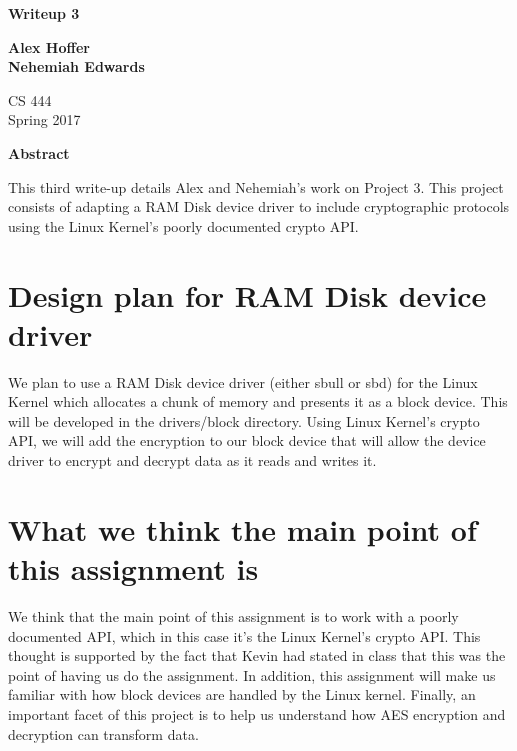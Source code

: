 \documentclass[letterpaper,10pt,titlepage]{article}
\begin{document}
\begin{titlepage}
    \begin{center}
        \vspace*{3.5cm}

        \textbf{Writeup 3}

        \vspace{0.5cm}

        \textbf{Alex Hoffer\\}
	\textbf{Nehemiah Edwards}

        \vspace{0.8cm}

        CS 444\\
        Spring 2017\\

        \vspace{1cm}

        \textbf{Abstract}\\

        \vspace{0.5cm}

	This third write-up details Alex and Nehemiah's work on Project 3. This project consists of adapting a RAM Disk device driver to include cryptographic protocols using the Linux Kernel's poorly documented crypto API.

        \vfill

    \end{center}
\end{titlepage}

\newpage

\tableofcontents

\newpage

\section{Design plan for RAM Disk device driver}
We plan to use a RAM Disk device driver (either sbull or sbd) for the Linux Kernel which allocates a chunk of memory and presents it as a block device. This will be developed in the drivers/block directory. Using Linux Kernel's crypto API, we will add the encryption to our block device that will allow the device driver to encrypt and decrypt data as it reads and writes it.

\section{What we think the main point of this assignment is}
We think that the main point of this assignment is to work with a poorly documented API, which in this case it's the Linux Kernel's crypto API. This thought is supported by the fact that Kevin had stated in class that this was the point of having us do the assignment. In addition, this assignment will make us familiar with how block devices are handled by the Linux kernel. Finally, an important facet of this project is to help us understand how AES encryption and decryption can transform data.
\end{document}
